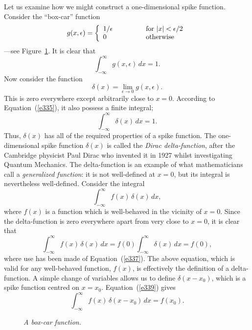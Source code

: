 Let us examine how we might construct a one-dimensional spike function.
Consider the ``box-car'' function
\begin{equation}
g(x,\epsilon) = \left\{
\begin{array}{lll}
1/\epsilon &\mbox{\hspace{1cm}}& {\rm for~} |x| < \epsilon/2\\
0 &&{\rm otherwise}
\end{array}
\right.
\end{equation}
---see Figure~\ref{f26}.
It is clear that 
\begin{equation}\label{e335}
\int_{-\infty}^{\infty} g(x,\epsilon)\,dx = 1.
\end{equation}
Now consider  the function 
\begin{equation}
\delta(x) = \lim_{\epsilon\rightarrow 0} g(x,\epsilon).
\end{equation}
This is zero everywhere except arbitrarily close to $x=0$. 
According to Equation~(\ref{e335}), 
it also possess a finite integral;
\begin{equation}\label{e337}
\int_{-\infty}^{\infty} \delta (x)\,dx = 1.
\end{equation}
Thus, $\delta(x)$ has all of the required properties of a spike function.
The one-dimensional  spike function $\delta(x)$ is called the 
{\em Dirac delta-function}, after the Cambridge physicist Paul Dirac who 
invented it in 1927 whilst investigating Quantum Mechanics. The delta-function is an
example of what mathematicians call a {\em generalized function}: it is not
well-defined at $x=0$, but its integral is nevertheless well-defined.
Consider the integral
\begin{equation}
\int_{-\infty}^{\infty} f(x)\,\delta(x)\,dx,
\end{equation}
where $f(x)$ is a function which is well-behaved in the vicinity of $x=0$. 
Since the delta-function is zero everywhere apart from very close
to $x=0$, it is clear that
\begin{equation}\label{e339}
\int_{-\infty}^{\infty}f(x)\, \delta(x)\,dx = f(0)\int_{-\infty}^{\infty} \delta(x)
\,dx = f(0),
\end{equation}
where use has been made of Equation~(\ref{e337}). The above equation, which is valid for any
well-behaved
function, $f(x)$, is effectively the definition of a delta-function. 
A simple change of variables allows us to define $\delta(x-x_0)$, which is
a  spike function centred on $x=x_0$. Equation~(\ref{e339}) gives
\begin{equation}
\int_{-\infty}^{\infty} f(x)\,\delta(x-x_0)\,dx = f(x_0).
\end{equation}
\begin{figure}
\centerline{}
\caption{\em A box-car function.}\label{f26}
\end{figure}

